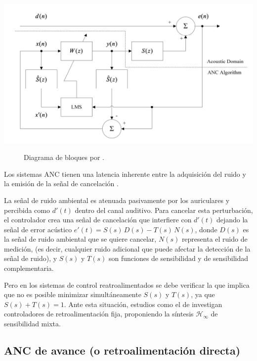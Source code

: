 \documentclass[a4paper,12pt]{article}
\begin{document}
\begin{center}
    \includegraphics[width=0.9\linewidth]{images/feedback_ANC.png}
\end{center}
\vspace{\captionSpace}
\begin{figure}[H]
    \caption{Diagrama de bloques por \textcite[][3]{Kuo2018}.}
    \label{fig:Kuo2018}
\end{figure}

Los sistemas ANC tienen una latencia inherente entre la adquisición del ruido y la emisión de la señal de cancelación \parencite{Liebich2016}.

La señal de ruido ambiental es atenuada pasivamente por los auriculares y percibida como $d'(t)$ dentro del canal auditivo.
Para cancelar esta perturbación, el controlador crea una señal de cancelación que interfiere con $d'(t)$ dejando la señal de error acústico $e'(t) = S(s) \, D(s) - T(s) \, N(s)$, donde $D(s)$ es la señal de ruido ambiental que se quiere cancelar, $N(s)$ representa el ruido de medición, (es decir, cualquier ruido adicional que puede afectar la detección de la señal de ruido), y $S(s)$ y $T(s)$ son funciones de sensibilidad y de sensibilidad complementaria.

Pero en los sistemas de control reatroalimentados se debe verificar la  que implica que no es posible minimizar simultáneamente $S(s)$ y $T(s)$, ya que $S(s) + T(s) = 1$.
Ante esta situación, estudios como el de \textcite{Liebich2016} investigan controladores de retroalimentación fija, proponiendo la síntesis $\mathcal{H}_\infty$ de sensibilidad mixta.

\subsection{ANC de avance (o retroalimentación directa)}
\end{document}
